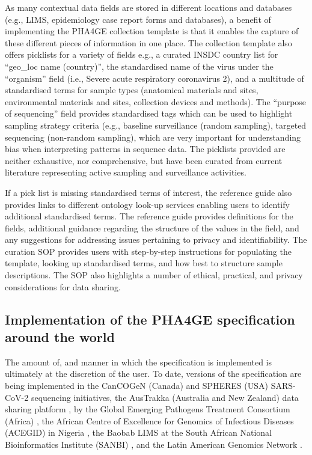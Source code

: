 

As many contextual data fields are stored in different locations and databases (e.g., LIMS, epidemiology case report forms and databases), a benefit of implementing the PHA4GE collection template is that it enables the capture of these different pieces of information in one place. The collection template also offers picklists for a variety of fields e.g., a curated INSDC country list for “geo\_loc name (country)”, the standardised name of the virus under the “organism” field (i.e., Severe acute respiratory coronavirus 2), and a multitude of standardised terms for sample types (anatomical materials and sites, environmental materials and sites, collection devices and methods). The “purpose of sequencing” field provides standardised tags which can be used to highlight sampling strategy criteria (e.g., baseline surveillance (random sampling), targeted sequencing (non-random sampling), which are very important for understanding bias when interpreting patterns in sequence data. The picklists provided are neither exhaustive, nor comprehensive, but have been curated from current literature representing active sampling and surveillance activities.

If a pick list is missing standardised terms of interest, the reference guide also provides links to different ontology look-up services enabling users to identify additional standardised terms. The reference guide provides definitions for the fields, additional guidance regarding the structure of the values in the field, and any suggestions for addressing issues pertaining to privacy and identifiability. The curation SOP provides users with step-by-step instructions for populating the template, looking up standardised terms, and how best to structure sample descriptions. The SOP also highlights a number of ethical, practical, and privacy considerations for data sharing.


\subsection{Implementation of the PHA4GE specification around the world}

The amount of, and manner in which the specification is implemented is ultimately at the discretion of the user. To date, versions of the specification are being implemented in the CanCOGeN (Canada) and SPHERES (USA) SARS-CoV-2 sequencing initiatives, the AusTrakka (Australia and New Zealand) data sharing platform \cite{world_health_organization_coronavirus_nodate, dong_interactive_2020, covid-19_genomics_uk_cog-uk_consortiumcontactcogconsortiumuk_integrated_2020}, by the Global Emerging Pathogens Treatment Consortium (Africa) \cite{noauthor_get_nodate}, the African Centre of Excellence for Genomics of Infectious Diseases (ACEGID) in Nigeria \cite{noauthor_acegid_nodate}, the Baobab LIMS \cite{noauthor_welcome_nodate} at the South African National Bioinformatics Institute (SANBI) \cite{noauthor_sanbi_nodate}, and the Latin American Genomics Network \cite{noauthor_covid-19_nodate}. 

